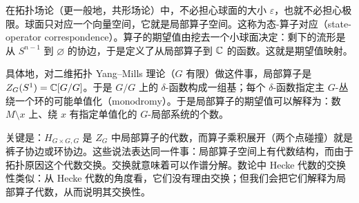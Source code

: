 在拓扑场论（更一般地，共形场论）中，不必担心球面的大小 $\varepsilon$，也就不必担心极限。球面只对应一个向量空间，它就是局部算子空间。这称为态-算子对应（state-operator correspondence）。算子的期望值由挖去一个小球面决定：剩下的流形是从 $S^{n-1}$ 到 $\varnothing$ 的协边，于是定义了从局部算子到 $\mathbb{C}$ 的函数。这就是期望值映射。


具体地，对二维拓扑 Yang--Mills 理论（$G$ 有限）做这件事，局部算子是 $Z_G(S^1)=\mathbb{C}[G/G]$。于是 $G/G$ 上的 $\delta$-函数构成一组基；每个 $\delta$-函数指定主 $G$-丛绕一个环的可能单值化（monodromy）。于是局部算子的期望值可以解释为：数 $M\setminus x$ 上、绕 $x$ 有指定单值化的 $G$-局部系统的个数。

关键是：$H_{G\times G,G}$ 是 $Z_G$ 中局部算子的代数，而算子乘积展开（两个点碰撞）就是裤子协边或环协边。这些说法表达同一件事：局部算子空间上有代数结构，而由于拓扑原因这个代数交换。交换就意味着可以作谱分解。数论中 Hecke 代数的交换性类似：从 Hecke 代数的角度看，它们没有理由交换；但我们会把它们解释为局部算子代数，从而说明其交换性。
